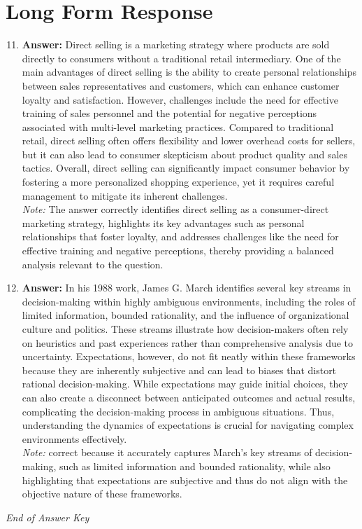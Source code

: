 \documentclass[12pt]{article}
\begin{document}
\section*{Long Form Response}
\begin{enumerate}[label=\arabic*.]
\setcounter{enumi}{10}
\item \textbf{Answer:} Direct selling is a marketing strategy where products are sold directly to consumers without a traditional retail intermediary. One of the main advantages of direct selling is the ability to create personal relationships between sales representatives and customers, which can enhance customer loyalty and satisfaction. However, challenges include the need for effective training of sales personnel and the potential for negative perceptions associated with multi-level marketing practices. Compared to traditional retail, direct selling often offers flexibility and lower overhead costs for sellers, but it can also lead to consumer skepticism about product quality and sales tactics. Overall, direct selling can significantly impact consumer behavior by fostering a more personalized shopping experience, yet it requires careful management to mitigate its inherent challenges.
\\ \textit{Note:} The answer correctly identifies direct selling as a consumer-direct marketing strategy, highlights its key advantages such as personal relationships that foster loyalty, and addresses challenges like the need for effective training and negative perceptions, thereby providing a balanced analysis relevant to the question.
\item \textbf{Answer:} In his 1988 work, James G. March identifies several key streams in decision-making within highly ambiguous environments, including the roles of limited information, bounded rationality, and the influence of organizational culture and politics. These streams illustrate how decision-makers often rely on heuristics and past experiences rather than comprehensive analysis due to uncertainty. Expectations, however, do not fit neatly within these frameworks because they are inherently subjective and can lead to biases that distort rational decision-making. While expectations may guide initial choices, they can also create a disconnect between anticipated outcomes and actual results, complicating the decision-making process in ambiguous situations. Thus, understanding the dynamics of expectations is crucial for navigating complex environments effectively.
\\ \textit{Note:} correct because it accurately captures March's key streams of decision-making, such as limited information and bounded rationality, while also highlighting that expectations are subjective and thus do not align with the objective nature of these frameworks.
\end{enumerate}

\vfill
\noindent\textit{End of Answer Key}
\end{document}
